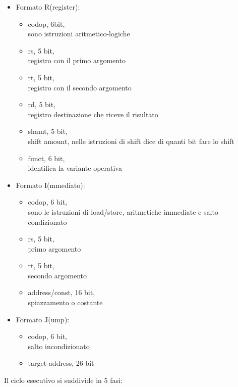 \documentclass[arch.tex]{subfiles}
\begin{document}
\begin{itemize}
	\item Formato R(register):
		\begin{itemize}
			\item codop, 6bit,\\
				sono istruzioni aritmetico-logiche
			\item rs, 5 bit,\\
				registro con il primo argomento
			\item rt, 5 bit,\\
				registro con il secondo argomento
			\item rd, 5 bit,\\
				registro destinazione che riceve il risultato
			\item shamt, 5 bit,\\
				shift amount, nelle istruzioni di shift dice di quanti bit 
				fare lo shift
			\item funct, 6 bit,\\
				identifica la variante operativa
		\end{itemize}
	\item Formato I(mmediato):
		\begin{itemize}
			\item codop, 6 bit,\\
				sono le istruzioni di load/store, aritmetiche immediate 
				e salto condizionato
			\item rs, 5 bit,\\
				primo argomento
			\item rt, 5 bit,\\
				secondo argomento
			\item address/const, 16 bit,\\
				spiazzamento o costante
		\end{itemize}	
	\item Formato J(ump):
		\begin{itemize}
			\item codop, 6 bit,\\
				salto incondizionato
			\item target address, 26 bit
		\end{itemize}
\end{itemize}

%
\label{ppar:Ciclo esecutivo MIPS}
Il ciclo esecutivo si suddivide in 5 fasi:
\end{document}
